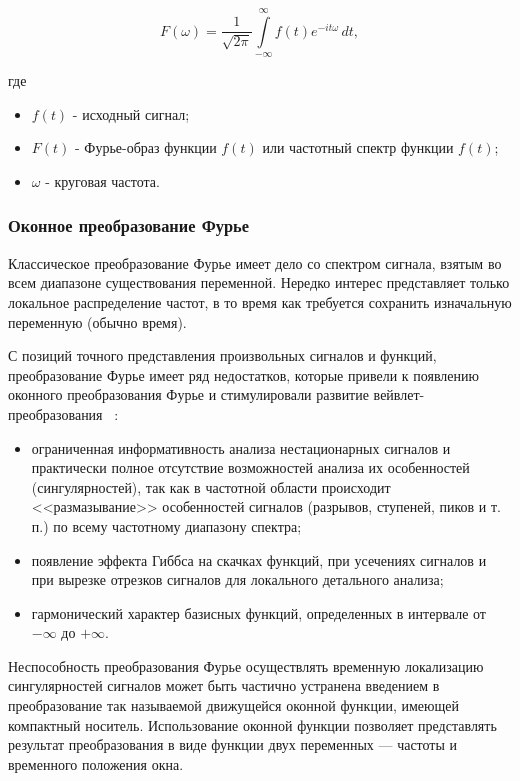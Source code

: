 \documentclass[utf8x, 14pt, oneside, a4paper]{article}
\begin{document}
	\begin{equation}
		F(\omega )={\frac  {1}{{\sqrt  {2\pi }}}}\int \limits _{{-\infty }}^{{\infty }}f(t)e^{{-it\omega }}\,dt,
	\end{equation}
	
	где 
	\begin{itemize}
		\item $f(t)$ - исходный сигнал;
		\item $F(t)$ - Фурье-образ функции $f(t)$ или частотный спектр функции $f(t)$;
		\item $\omega$ - круговая частота.
	\end{itemize}
	
	\subsubsection{Оконное преобразование Фурье}
	
	Классическое преобразование Фурье имеет дело со спектром сигнала, взятым во всем диапазоне существования переменной. Нередко интерес представляет только локальное распределение частот, в то время как требуется сохранить изначальную переменную (обычно время).
	
	С позиций точного представления произвольных сигналов и функций, преобразование Фурье имеет ряд недостатков, которые привели к появлению оконного преобразования Фурье и стимулировали развитие вейвлет-\linebreak преобразования ~\cite{wavelet_neuron}: 
	\begin{itemize}
		\item ограниченная информативность анализа нестационарных сигналов и практически полное отсутствие возможностей анализа их особенностей (сингулярностей), так как в частотной области происходит <<размазывание>> особенностей сигналов (разрывов, ступеней, пиков и т. п.) по всему частотному диапазону спектра;
		\item появление эффекта Гиббса на скачках функций, при усечениях сигналов и при вырезке отрезков сигналов для локального детального анализа;
		\item  гармонический характер базисных функций, определенных в интервале от $-\infty$ до $+\infty$.
	\end{itemize} 

	Неспособность преобразования Фурье осуществлять временную локализацию сингулярностей сигналов может быть частично устранена введением в преобразование так называемой движущейся оконной функции, имеющей компактный носитель. Использование оконной функции позволяет представлять результат преобразования в виде функции двух переменных — частоты и временного положения окна.
	
\end{document}
